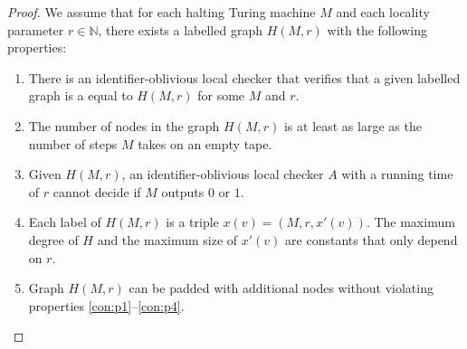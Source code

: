 \documentclass[11pt,a4paper]{article}
\theoremstyle{definition}
\theoremstyle{remark}
\begin{document}
\begin{proof}
We assume that for each halting Turing machine $M$ and each locality parameter $r \in \mathbb{N}$, there exists a labelled graph $H(M,r)$ with the following properties:
\begin{enumerate}[label=(P\arabic*),leftmargin=9mm]
    \item There is an identifier-oblivious local checker that verifies that a given labelled graph is a equal to $H(M,r)$ for some $M$ and $r$. \label{con:p1}
    \item The number of nodes in the graph $H(M,r)$ is at least as large as the number of steps $M$ takes on an empty tape. \label{con:p2}
    \item Given $H(M,r)$, an identifier-oblivious local checker $A$ with a running time of $r$ cannot decide if $M$ outputs $0$ or $1$. \label{con:p3}
    \item Each label of $H(M,r)$ is a triple $x(v) = (M,r,x'(v))$. The maximum degree of $H$ and the maximum size of $x'(v)$ are constants that only depend on $r$. \label{con:p4}
    \item Graph $H(M,r)$ can be padded with additional nodes without violating properties \ref{con:p1}--\ref{con:p4}.
\end{enumerate}


\end{proof}
\end{document}
